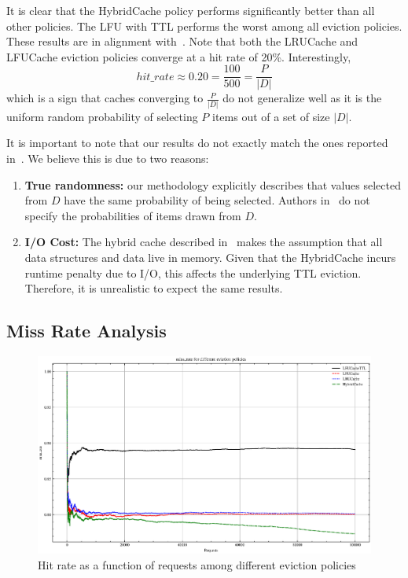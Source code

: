It is clear that the HybridCache policy performs significantly
better than all other policies. The LFU with TTL performs the worst
among all eviction policies. These results
are in alignment with~\cite{shah2023ImprovedCacheEviction}.
Note that both the LRUCache and LFUCache eviction
policies converge at a hit rate of 20\%.
Interestingly, \[hit\_rate \approx 0.20 = \frac{100}{500} = \frac{P}{|D|}\]
which is a sign that caches converging
to $\frac{P}{|D|}$ do not generalize well as it
is the uniform random probability of selecting $P$ items
out of a set of size $|D|$.

It is important to note that our results do not
exactly match
the ones reported in~\cite{shah2023ImprovedCacheEviction}.
We believe this is due to two reasons:

\begin{enumerate}
    \item \textbf{True randomness:} our methodology explicitly
    describes that values selected from $D$ have the same
    probability of being selected. Authors in~\cite{shah2023ImprovedCacheEviction}
    do not specify the probabilities of items drawn from $D$.
    \item \textbf{I/O Cost:} The hybrid cache
    described in~\cite{shah2023ImprovedCacheEviction}
    makes the assumption that all data structures
    and data live in memory. Given that the HybridCache
    incurs runtime penalty due to I/O, this affects
    the underlying TTL eviction. Therefore,
    it is unrealistic to expect the same results.
\end{enumerate}

\subsection{Miss Rate Analysis}
\begin{figure}[!htp]
    \centering
    \includegraphics[width=\textwidth]{images/miss_rate_plot.eps} %
    \caption{Hit rate as a function of requests among different eviction policies}
    \label{fig:miss_rate_plot}
\end{figure}

